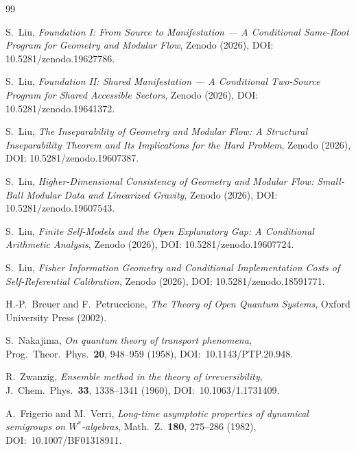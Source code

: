 \documentclass[12pt]{article}
\theoremstyle{definition}
\theoremstyle{remark}
\begin{document}
\newpage
{}

\begin{thebibliography}{99}
\sloppy

S.~Liu, \emph{Foundation I: From Source to Manifestation --- A Conditional Same-Root Program for Geometry and Modular Flow}, Zenodo (2026), DOI: 10.5281/zenodo.19627786.

S.~Liu, \emph{Foundation II: Shared Manifestation --- A Conditional Two-Source Program for Shared Accessible Sectors}, Zenodo (2026), DOI: 10.5281/zenodo.19641372.

S.~Liu, \emph{The Inseparability of Geometry and Modular Flow: A Structural Inseparability Theorem and Its Implications for the Hard Problem}, Zenodo (2026), DOI: 10.5281/zenodo.19607387.

S.~Liu, \emph{Higher-Dimensional Consistency of Geometry and Modular Flow: Small-Ball Modular Data and Linearized Gravity}, Zenodo (2026), DOI: 10.5281/zenodo.19607543.

S.~Liu, \emph{Finite Self-Models and the Open Explanatory Gap: A Conditional Arithmetic Analysis}, Zenodo (2026), DOI: 10.5281/zenodo.19607724.

S.~Liu, \emph{Fisher Information Geometry and Conditional Implementation Costs of Self-Referential Calibration}, Zenodo (2026), DOI: 10.5281/zenodo.18591771.

H.-P.~Breuer and F.~Petruccione,
\emph{The Theory of Open Quantum Systems},
Oxford University Press (2002).

S.~Nakajima,
\emph{On quantum theory of transport phenomena},
Prog.\ Theor.\ Phys.\ \textbf{20}, 948--959 (1958),
DOI:~10.1143/PTP.20.948.

R.~Zwanzig,
\emph{Ensemble method in the theory of irreversibility},
J.\ Chem.\ Phys.\ \textbf{33}, 1338--1341 (1960),
DOI:~10.1063/1.1731409.

A.~Frigerio and M.~Verri,
\emph{Long-time asymptotic properties of dynamical semigroups on \(W^*\)-algebras},
Math.\ Z.\ \textbf{180}, 275--286 (1982),
DOI:~10.1007/BF01318911.

\end{thebibliography}
 
\end{document}
